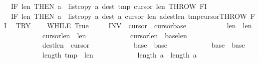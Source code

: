 \begin{isabellebody}
\ \ IF\ {\isasymacute}len{}{\isacharequal}{}\ THEN\ {\isasymacute}a\ {\isacharcolon}{\isacharequal}{\isacharequal}\ list{\isacharunderscore}copy\ {\isasymacute}a\ {\isasymacute}dest\ {\isasymacute}tmp\ {\isasymacute}cursor{}\ {\isasymacute}len{}{\isacharsemicolon}{\isacharsemicolon}\ THROW\ FI{\isacharsemicolon}{\isacharsemicolon}\isanewline
\ \ IF\ {\isasymacute}len{}{\isacharequal}{}\ THEN\ {\isasymacute}a\ {\isacharcolon}{\isacharequal}{\isacharequal}\ list{\isacharunderscore}copy\ {\isasymacute}a\ {\isasymacute}dest\ {\isasymacute}a\ {\isasymacute}cursor{}\ {\isasymacute}len{}{\isacharsemicolon}{\isacharsemicolon}\ {\isasymacute}a{\isacharbang}{\isacharparenleft}{\isasymacute}dest{\isacharplus}{\isasymacute}len{}{\isacharparenright}{\isacharcolon}{\isacharequal}{\isacharequal}\ {\isasymacute}tmp{\isacharbang}{\isasymacute}cursor{}{\isacharsemicolon}{\isacharsemicolon}THROW\ FI{\isacharsemicolon}{\isacharsemicolon}\isanewline
\ \ TRY\isanewline
\ \ \ \ WHILE\ True\ \isanewline
\ \ \ \ INV\ {\isasymlbrace}\ {\isasymacute}cursor{}{\isasymge}{}\ {\isasymand}\ {\isasymacute}cursor{}{\isasymge}{\isasymacute}base{}\ {\isasymand}\isanewline
\ \ \ \ \ \ \ \ \ \ {\isasymacute}len{}{\isachargreater}{}\ {\isasymand}\ {\isasymacute}len{}{\isachargreater}{}\ {\isasymand}\isanewline
\ \ \ \ \ \ \ \ \ \ \ {\isasymacute}cursor{}{\isacharplus}{\isasymacute}len{}\ {\isacharequal}\ \isactrlbsup {\isasymsigma}\isactrlesup len{}\ {\isasymand}\isanewline
\ \ \ \ \ \ \ \ \ \ \ {\isasymacute}cursor{}{\isacharplus}{\isasymacute}len{}\ {\isacharequal}\ {\isasymacute}base{}{\isacharplus}\isactrlbsup {\isasymsigma}\isactrlesup len{}\ {\isasymand}\isanewline
\ \ \ \ \ \ \ \ \ \ \ {\isasymacute}dest{\isacharplus}{\isasymacute}len{}\ {\isacharequal}\ {\isasymacute}cursor{}\ {\isasymand}\isanewline
\ \ \ \ \ \ \ \ \ \ \ {\isasymacute}base{}\ {\isacharequal}\ \isactrlbsup {\isasymsigma}\isactrlesup base{}\ {\isasymand}\isanewline
\ \ \ \ \ \ \ \ \ \ \ {\isasymacute}base{}\ {\isacharequal}\ \isactrlbsup {\isasymsigma}\isactrlesup base{}\ {\isasymand}\isanewline
\ \ \ \ \ \ \ \ \ \ \ length\ {\isasymacute}tmp\ {\isacharequal}\ \isactrlbsup {\isasymsigma}\isactrlesup len{}\ {\isasymand}\isanewline
\ \ \ \ \ \ \ \ \ \ \ length\ {\isasymacute}a\ {\isacharequal}\ length\ \isactrlbsup {\isasymsigma}\isactrlesup a\ {\isasymand}\isanewline

\end{isabellebody}
